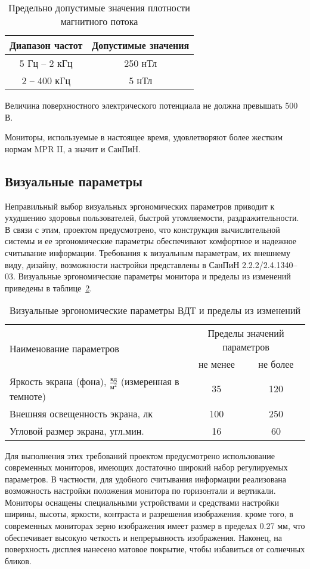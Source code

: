 \begin{table}[ht]
\caption{Предельно допустимые значения плотности магнитного потока}
\begin{tabular}{|c|c|}
\hline
Диапазон частот& Допустимые значения \\
\hline
5 Гц -- 2 кГц & 250 нТл \\
\hline
2 -- 400 кГц& 5 нТл \\
\hline
\end{tabular}
\label{tab:ro}
\end{table}

Величина поверхностного электрического потенциала не должна превышать 500 В.

Мониторы, используемые в настоящее время, удовлетворяют более жестким нормам MPR II, а значит и СанПиН.

\subsection{Визуальные параметры}

Неправильный выбор визуальных эргономических параметров приводит к ухудшению здоровья пользователей, быстрой утомляемости, раздражительности. В связи с этим, проектом предусмотрено, что конструкция вычислительной системы и ее эргономические параметры обеспечивают комфортное и надежное считывание информации. Требования к визуальным параметрам, их внешнему виду, дизайну, возможности настройки представлены в СанПиН 2.2.2/2.4.1340--03. Визуальные эргономические параметры монитора и пределы из изменений приведены в таблице~\ref{tab:ergonom}.

\begin{table}[ht]
\caption{Визуальные эргономические параметры ВДТ и пределы из изменений}
\begin{tabular}{|p{}|c|c|}
\hline
\multirow{2}{*}{Наименование параметров} & \multicolumn{2}{c|}{Пределы значений параметров}\\
\cline{2-3}
&не менее&не более\\
\hline
Яркость экрана (фона), $\frac{\text{кд}}{\text{м}^2}$ (измеренная в темноте) &35&120\\
\hline
Внешняя освещенность экрана, лк &100&250\\
\hline
Угловой размер экрана, угл.мин. &16&60\\
\hline
\end{tabular}
\label{tab:ergonom}
\end{table}

Для выполнения этих требований проектом предусмотрено использование современных мониторов, имеющих достаточно широкий набор регулируемых параметров.  В частности, для удобного считывания информации реализована возможность настройки положения монитора по горизонтали и вертикали. Мониторы оснащены специальными устройствами и средствами настройки ширины, высоты, яркости, контраста и разрешения изображения. кроме того, в современных мониторах зерно изображения имеет размер в пределах 0.27 мм, что обеспечивает высокую четкость и непрерывность изображения. Наконец, на поверхность дисплея нанесено матовое покрытие, чтобы избавиться от солнечных бликов.

